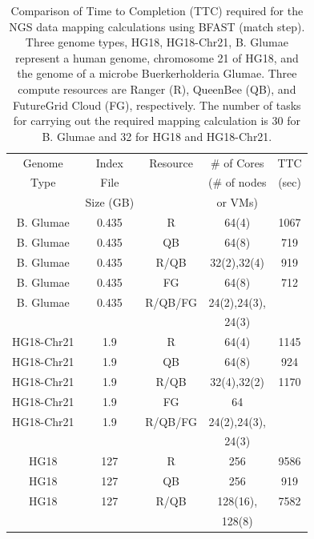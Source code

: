 \documentclass{sig-alternate}
\begin{document}
 \begin{table}
\small
 \begin{tabular}{|c|c|c|c|c|} 
 \hline 
Genome & Index           & Resource    & \# of Cores             &	TTC  \\
  Type               &  File      & & (\# of nodes & (sec)\\  
  & Size (GB)  &   & or VMs) & \\   \hline
 B. Glumae &0.435& R&	64(4)	&1067 \\
\hline                  
B. Glumae &0.435& QB	&	64(8)	&719 \\
\hline
 B. Glumae &0.435&R/QB	&	32(2),32(4) &919 \\
\hline
 B. Glumae &0.435& FG &	64(8)	&712 \\
\hline
 B. Glumae &0.435 &  R/QB/FG &	24(2),24(3),& \\
& &  & 24(3) & \\  \hline  \hline

HG18-Chr21 &1.9& R	&	64(4)&1145 \\
\hline
HG18-Chr21 &1.9& QB	&	64(8)	&924 \\
\hline
HG18-Chr21 &1.9& R/QB	&	32(4),32(2)	&1170 \\
\hline
HG18-Chr21 &1.9& FG	&	64	& \\
\hline
HG18-Chr21 &1.9& R/QB/FG	&	24(2),24(3),	& \\
&& 	 &24(3)&\\
\hline
\hline
HG18 &127& R	&	256	&9586\\
\hline
HG18 &127& QB	&	256	&919 \\
\hline
HG18 &127& R/QB	&	128(16),&7582 \\
&  &  &   128(8)  &  \\
\hline
\end{tabular}
\caption{Comparison of Time to Completion (TTC) required for the NGS data mapping calculations using BFAST (match step).  Three genome types, HG18, HG18-Chr21, B. Glumae represent a human genome, chromosome 21 of HG18, and the genome of a microbe Buerkerholderia Glumae.  Three compute resources are Ranger (R), QueenBee (QB), and FutureGrid Cloud (FG), respectively.  The number of tasks for carrying out the required mapping calculation is 30 for B. Glumae and 32 for HG18 and HG18-Chr21.}

  \label{table:NGS-Distributed} 
\end{table}
\end{document}
